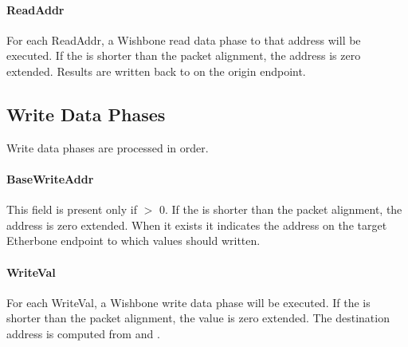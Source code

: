 \documentclass{article}
\begin{document}
\paragraph{ReadAddr} \label{field:ReadAddr}
For each ReadAddr, 
a Wishbone read data phase to that address will be executed.
If the  is shorter than the packet alignment, 
the address is zero extended.
Results are written back to  on the origin endpoint.

\subsection{Write Data Phases}

Write data phases are processed in order.

\paragraph{BaseWriteAddr} \label{field:BaseWriteAddr}
This field is present only if  $>$ 0.
If the  is shorter than the packet alignment, 
the address is zero extended.
When it exists it indicates the address on the target Etherbone endpoint 
to which values should written.

\paragraph{WriteVal} \label{field:WriteVal}
For each WriteVal, 
a Wishbone write data phase will be executed.
If the  is shorter than the packet alignment, 
the value is zero extended.
The destination address is computed from  and 
.
\end{document}
